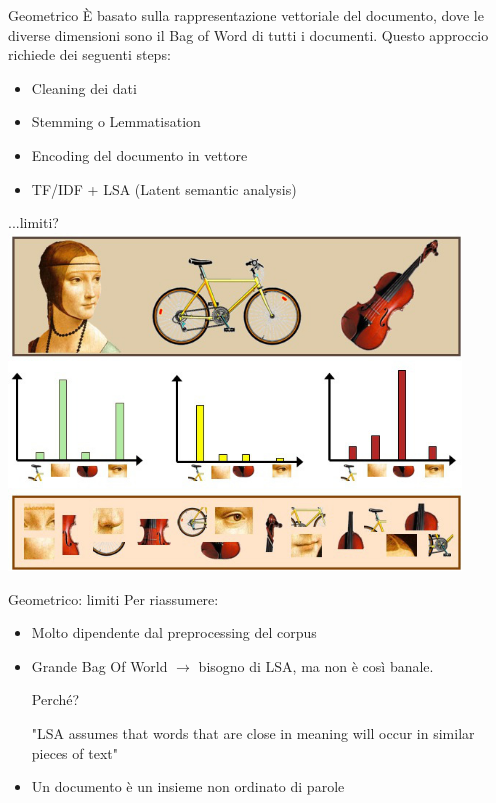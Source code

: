 \documentclass[british]{beamer}
\begin{document}
	\begin{frame}{Geometrico}	
		\`{E} basato sulla rappresentazione vettoriale del documento, dove le diverse dimensioni sono il Bag of Word di tutti i documenti.
		Questo approccio richiede dei seguenti steps:
		\begin{itemize}
			\item Cleaning dei dati
			\item Stemming o Lemmatisation
			\item Encoding del documento in vettore
			\item TF/IDF + LSA (Latent semantic analysis)
		\end{itemize}
	\end{frame}
	
	\begin{frame}{...limiti?}
			\includegraphics[width=0.9\textwidth, height=0.8\textheight]{./Imgs/bow-example.jpeg}
	\end{frame}
	
	\begin{frame}{Geometrico: limiti}
		Per riassumere:
		\begin{itemize}
			\item Molto dipendente dal preprocessing del corpus
			\item Grande Bag Of World $\rightarrow$ bisogno di LSA, ma non \`{e} così banale. 
			
			Perch\'{e}?
			\begin{displayquote}
				"LSA assumes that words that are close in meaning will occur in similar pieces of text"
			\end{displayquote}
			\item Un documento \`{e} un insieme \alert{non ordinato} di parole  
		\end{itemize}	
	\end{frame}
	
\end{document}
